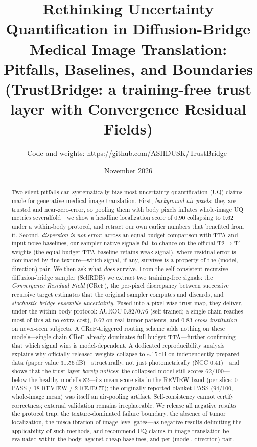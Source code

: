 \documentclass[11pt]{article}
\title{Rethinking Uncertainty Quantification in Diffusion-Bridge Medical Image
Translation: Pitfalls, Baselines, and Boundaries\\
\large (TrustBridge: a training-free trust layer with
Convergence Residual Fields)}
\author{%
  \small Code and weights: \url{https://github.com/ASHDUSK/TrustBridge-}
}
\date{November 2026}
\begin{document}
\maketitle

\begin{abstract}
Two silent pitfalls can systematically bias most uncertainty-quantification
(UQ) claims made for generative medical image translation. First, \emph{background air pixels}:
they are trusted and near-zero-error, so pooling them with body pixels
inflates whole-image UQ metrics severalfold---we show a headline localization
score of $0.90$ collapsing to $0.62$ under a within-body protocol, and retract
our own earlier numbers that benefited from it. Second, \emph{dispersion is
not error}: across an equal-budget comparison with TTA and input-noise
baselines, our sampler-native signals fall to chance on the official
T2$\to$T1 weights (the equal-budget TTA baseline retains weak signal), where
residual error is dominated by fine texture---which signal, if
any, survives is a property of the (model, direction) pair. We then ask
what \emph{does} survive. From the self-consistent recursive diffusion-bridge
sampler (SelfRDB) we extract two training-free signals: the
\emph{Convergence Residual Field} (CReF), the per-pixel discrepancy between
successive recursive target estimates that the original sampler computes and
discards, and \emph{stochastic-bridge ensemble uncertainty}. Fused into a pixel-wise trust map, they deliver, under the within-body protocol:
AUROC $0.82$/$0.76$ (self-trained; a single chain reaches most of this at
no extra cost), $0.62$ on real tumor patients, and $0.83$ \emph{cross-institution}
on never-seen subjects. A CReF-triggered routing
scheme adds nothing on these models---single-chain CReF already dominates
full-budget TTA---further confirming that which signal wins is
model-dependent. A dedicated reproducibility analysis
explains why officially released weights collapse to ${\sim}15$\,dB on
independently prepared data (paper value 31.56\,dB)---structurally, not
just photometrically (NCC 0.41)---and shows that the trust layer
\emph{barely notices}: the collapsed model still scores $62/100$---below
the healthy model's $82$---its mean score sits in the REVIEW band (per-slice:
0 PASS / 18 REVIEW / 2 REJECT); the originally reported blanket PASS
($94/100$, whole-image mean) was itself an air-pooling artifact. Self-consistency cannot certify correctness; external
validation remains irreplaceable. We release all negative
results---the protocol trap, the texture-dominated failure boundary, the
absence of tumor localization, the miscalibration of image-level gates---as negative results delimiting the applicability of such methods, and
recommend UQ claims in image translation be
evaluated within the body, against cheap baselines, and per (model, direction)
pair.
\end{abstract}
\end{document}
